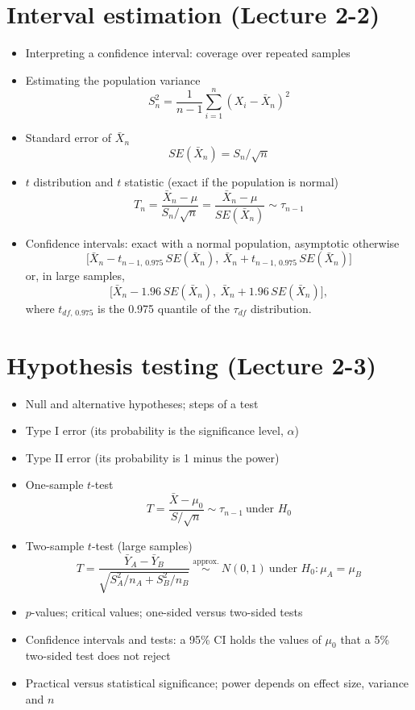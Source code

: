\documentclass[11pt]{article}
\begin{document}
\section{Interval estimation (Lecture 2-2)}

\begin{itemize}
\item Interpreting a confidence interval: coverage over repeated samples
\item Estimating the population variance
\[
S_{n}^2=\frac{1}{n-1}\sum_{i=1}^{n}(X_i-\bar X_n)^2
\]
\item Standard error of $\bar X_n$
\[
SE(\bar X_n)=S_{n}/\sqrt{n}
\]
\item $t$ distribution and $t$ statistic (exact if the population is normal)
\[
T_n=\frac{\bar X_n-\mu}{S_n/\sqrt{n}}=\frac{\bar X_n-\mu}{SE(\bar X_n)} \sim \tau_{n-1}
\]
\item Confidence intervals: exact with a normal population, asymptotic otherwise
\[
\big[\bar X_n-t_{n-1,\,0.975}\,SE(\bar X_n),\ \bar X_n+t_{n-1,\,0.975}\,SE(\bar X_n)\big]
\]
or, in large samples,
\[
\big[\bar X_n-1.96\,SE(\bar X_n),\ \bar X_n+1.96\,SE(\bar X_n)\big],
\]
where $t_{df,\,0.975}$ is the 0.975 quantile of the $\tau_{df}$ distribution.
\end{itemize}

\section{Hypothesis testing (Lecture 2-3)}

\begin{itemize}
\item Null and alternative hypotheses; steps of a test
\item Type I error (its probability is the significance level, $\alpha$)
\item Type II error (its probability is 1 minus the power)
\item One-sample $t$-test
\[
T=\frac{\bar X-\mu_0}{S/\sqrt{n}} \sim \tau_{n-1}\ \text{under } H_0
\]
\item Two-sample $t$-test (large samples)
\[
T=\frac{\bar Y_A-\bar Y_B}{\sqrt{S_A^2/n_A+S_B^2/n_B}} \ \stackrel{\text{approx.}}{\sim}\ N(0,1)\ \text{under } H_0\!: \mu_A=\mu_B
\]
\item $p$-values; critical values; one-sided versus two-sided tests
\item Confidence intervals and tests: a 95\% CI holds the values of $\mu_0$ that a 5\% two-sided test does not reject
\item Practical versus statistical significance; power depends on effect size, variance and $n$
\end{itemize}
\end{document}
